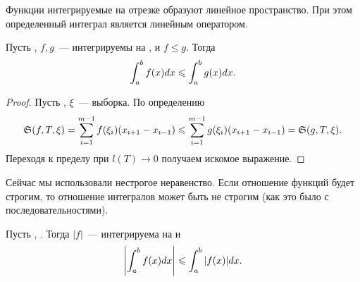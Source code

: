 \documentclass[../main.tex]{subfiles}
\begin{document}
\begin{note}
    Функции интегрируемые на отрезке \segab\space образуют линейное пространство. При этом определенный интеграл является линейным оператором.
\end{note}

\begin{proposition}
    Пусть \fgabr, $f,g$~--- интегрируемы на \segab, и $f \leq g$. Тогда 
    \begin{gather*}
        \int_a^b f(x) dx \leqslant \int_a^b g(x) dx.
    \end{gather*}
\end{proposition}

\begin{proof}
    Пусть \tpab, $\xi$~--- выборка. По определению 
    \begin{gather*}
        \mathfrak{S}(f, T, \xi) = \sum_{i=1}^{m-1} f(\xi_i)(x_{i+1} - x_{i-1}) \leqslant \sum_{i=1}^{m-1} g(\xi_i)(x_{i+1} - x_{i-1}) = \mathfrak{S}(g, T,\xi).
    \end{gather*}
    Переходя к пределу при $l(T) \to 0$ получаем искомое выражение.
\end{proof}

\begin{note}
    Сейчас мы использовали нестрогое неравенство. Если отношение функций будет строгим, то отношение интегралов может быть не строгим (как это было с последовательностями).
\end{note}

\begin{proposition}
    Пусть \fabr, \fintonab. Тогда $|f|$~--- интегрируема на \segab \space и 
    \begin{gather*}
        \left|\int_a^b f(x) dx\right| \leqslant \int_a^b|f(x)|dx.
    \end{gather*}
\end{proposition}
\end{document}

